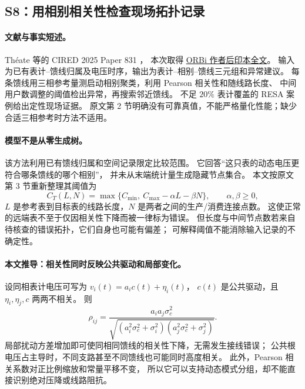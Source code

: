 \documentclass[UTF8,11pt,fontset=fandol]{ctexart}
\theoremstyle{remark}
\numberwithin{equation}{section}
\begin{document}
\subsection{S8：用相别相关性检查现场拓扑记录}
\label{subsec:S8}

\paragraph{文献与事实短述。}
Théate 等的 CIRED 2025 Paper 831 \citep{S8}，
本次取得 \href{https://orbi.uliege.be/bitstream/2268/327542/1/831.pdf}{ORBi 作者后印本全文}。
输入为已有表计--馈线归属及电压时序，输出为表计--相别--馈线三元组和异常建议。
每条馈线用三相参考量测启动相别聚类，利用 Pearson 相关性和随线路长度、
中间用户数调整的阈值检出异常，再搜索邻近馈线。
不足 $20\%$ 表计覆盖的 RESA 案例给出定性现场证据。
原文第 2 节明确没有可靠真值，不能严格量化性能；缺少合适三相参考时方法不适用。

\paragraph{模型不是从零生成树。}
该方法利用已有馈线归属和空间记录限定比较范围。
它回答“这只表的动态电压更符合哪条馈线的哪个相别”，
并未从末端统计量生成隐藏节点集合。
本文按原文第 3 节重新整理其阈值为
\begin{equation}
 C_T(L,N)=\max\{C_{\min},\ C_{\max}-\alpha L-\beta N\},
 \qquad \alpha,\beta\geq0,
 \label{eq:eng-s8-threshold}
\end{equation}
$L$ 是参考表到目标表的线路长度，$N$ 是两者之间的生产/消费连接点数。
这使正常的远端表不至于仅因相关性下降而被一律标为错误。
但长度与中间节点数若来自待核查的错误拓扑，它们自身也可能有偏差；
可解释阈值不能消除输入记录的不确定性。

\paragraph{本文推导：相关性同时反映公共驱动和局部变化。}
设同相表计电压可写为 $v_i(t)=a_i c(t)+\eta_i(t)$，
$c(t)$ 是公共驱动，且 $\eta_i,\eta_j,c$ 两两不相关。
则
\begin{equation}
 \rho_{ij}=\frac{a_i a_j\sigma_c^2}
 {\sqrt{(a_i^2\sigma_c^2+\sigma_i^2)
              (a_j^2\sigma_c^2+\sigma_j^2)}}.
 \label{eq:eng-s8-correlation}
\end{equation}
局部扰动方差增加即可使同相同馈线的相关性下降，无需发生接线错误；
公共根电压占主导时，不同支路甚至不同馈线也可能同时高度相关。
此外，Pearson 相关系数对正比例缩放和常量平移不变，
所以它可以支持动态模式分组，却不能直接识别绝对压降或线路阻抗。
\end{document}
